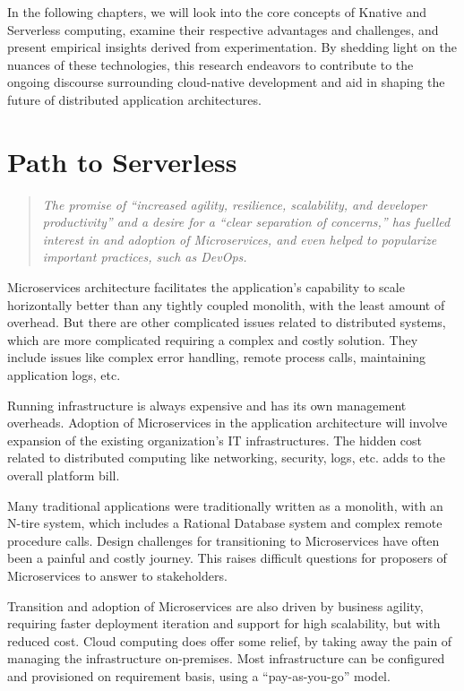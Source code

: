 \documentclass[12pt]{article}
\begin{document}
\begin{flushleft}
In the following chapters, we will look into the core concepts of Knative and Serverless computing, examine their respective advantages and challenges, and present empirical insights derived from experimentation. By shedding light on the nuances of these technologies, this research endeavors to contribute to the ongoing discourse surrounding cloud-native development and aid in shaping the future of distributed application architectures.
\end{flushleft}
\pagebreak


\section{Path to Serverless}
\begin{flushleft}
\begin{quote}
    \textit{The promise of “increased agility, resilience, scalability, and developer productivity” and a desire for a “clear separation of concerns,” has fuelled interest in and adoption of Microservices, and even helped to popularize important practices, such as DevOps.}\\
    \cite{KillaleaTom-2016}
\end{quote}
Microservices architecture facilitates the application’s capability to scale horizontally better than any tightly coupled monolith, with the least amount of overhead. But there are other complicated issues related to distributed systems, which are more complicated requiring a complex and costly solution. They include issues like complex error handling, remote process calls, maintaining application logs, etc.

Running infrastructure is always expensive and has its own management overheads. Adoption of Microservices in the application architecture will involve expansion of the existing organization’s IT infrastructures. The hidden cost related to distributed computing like networking, security, logs, etc. adds to the overall platform bill.

Many traditional applications were traditionally written as a monolith, with an N-tire system, which includes a Rational Database system and complex remote procedure calls. Design challenges for transitioning to Microservices have often been a painful and costly journey. This raises difficult questions for proposers of Microservices to answer to stakeholders.

Transition and adoption of Microservices are also driven by business agility, requiring faster deployment iteration and support for high scalability, but with reduced cost. 
Cloud computing does offer some relief, by taking away the pain of managing the infrastructure on-premises. Most infrastructure can be configured and provisioned on requirement basis, using a “pay-as-you-go” model. 


\end{flushleft}
\end{document}
